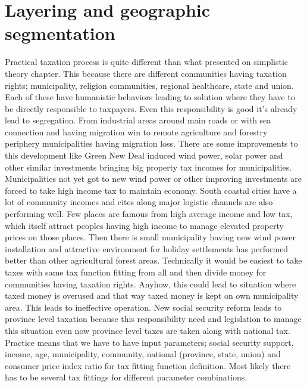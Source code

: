 \section{Layering and geographic segmentation}
\label{tax_layering}
Practical taxation process is quite different than what presented on simplistic theory chapter.
This because there are different communities having taxation rights;
municipality, religion communities, regional healthcare, state and union.
Each of these have humanistic behaviors leading to solution where they have to be directly responsible to taxpayers.
Even this responsibility is good it's already lead to segregation.
From industrial areas around main roads or with sea connection
and having migration win to remote agriculture
and forestry periphery municipalities having migration loss.
There are some improvements to this development like Green New Deal induced wind power,
solar power and other similar investments bringing big property tax incomes for municipalities.
Municipalities not yet got to new wind power or other improving investments
are forced to take high income tax to maintain economy.
South coastal cities have a lot of community incomes
and cites along major logistic channels are also performing well.
Few places are famous from high average income and low tax,
which itself attract peoples having high income to manage elevated property prices on those places.
Then there is small municipality having new wind power installation and attractive environment
for holiday settlements has performed better than other agricultural forest areas.
Technically it would be easiest to take taxes with same tax function fitting from all
and then divide money for communities having taxation rights.
Anyhow, this could lead to situation where taxed money is overused
and that way taxed money is kept on own municipality area.
This leads to ineffective operation.
New social security reform leads to province level taxation because this responsibility need
and legislation to manage this situation even now province level taxes are taken along with national tax.
Practice means that we have to have input parameters;
social security support, income, age, municipality, community, national (province, state, union)
and consumer price index ratio for tax fitting function definition.
Most likely there has to be several tax fittings for different parameter combinations.


